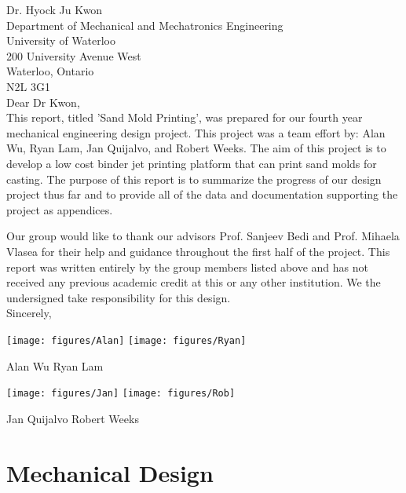 \documentclass[11pt]{article}
\begin{document}
\noindent Dr. Hyock Ju Kwon \\
\newline
Department of Mechanical and Mechatronics Engineering\\
University of Waterloo \\
200 University Avenue West \\
Waterloo, Ontario \\
N2L 3G1 \\

\noindent Dear Dr Kwon,\\

This report, titled 'Sand Mold Printing', was prepared for our fourth year mechanical engineering design project. This project was a team effort by: Alan Wu, Ryan Lam, Jan Quijalvo, and Robert Weeks. The aim of this project is to develop a low cost binder jet printing platform that can print sand molds for casting. The purpose of this report is to summarize the progress of our design project thus far and to provide all of the data and documentation supporting the project as appendices.

Our group would like to thank our advisors Prof. Sanjeev Bedi and Prof. Mihaela Vlasea for their help and guidance throughout the first half of the project. This report was written entirely by the group members listed above and has not received any previous academic credit at this or any other institution. We the undersigned take responsibility for this design.\\


\noindent Sincerely,

\begin{center}
\texttt{[image: figures/Alan]}
\texttt{[image: figures/Ryan]}

Alan Wu \hspace{40mm} Ryan Lam
\end{center}


\begin{center}
\texttt{[image: figures/Jan]}
\texttt{[image: figures/Rob]}

Jan Quijalvo \hspace{35mm} Robert Weeks
\end{center}
\newpage

\tableofcontents
\newpage
\listoffigures
\newpage
\listoftables
\newpage


\section{Mechanical Design}
\end{document}
